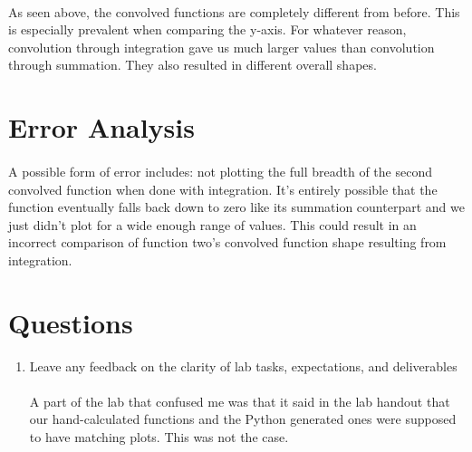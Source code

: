 \documentclass[12pt]{report}
\begin{document}
    \paragraph{} As seen above, the convolved functions are completely different from before. This is especially prevalent when comparing the y-axis. For whatever reason, convolution through integration gave us much larger values than convolution through summation. They also resulted in different overall shapes.  
      

\section{Error Analysis}


\paragraph{} A possible form of error includes: not plotting the full breadth of the second convolved function when done with integration. It's entirely possible that the function eventually falls back down to zero like its summation counterpart and we just didn't plot for a wide enough range of values. This could result in an incorrect comparison of function two's convolved function shape resulting from integration.  

\section{Questions} %
    \begin{enumerate}
        \item Leave any feedback on the clarity of lab tasks, expectations, and deliverables
        \paragraph{} A part of the lab that confused me was that it said in the lab handout that our hand-calculated functions and the Python generated ones were supposed to have matching plots. This was not the case. 
    \end{enumerate}
\end{document}
